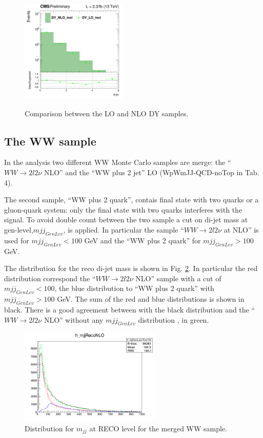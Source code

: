 \begin{figure}[htbp]
{\includegraphics[width=0.45\textwidth]{../AN/Figs/DY/LOvsNLO/log_cratio_dyee_13TeV_njet.png}
}
\caption{
    Comparison between the LO and NLO DY samples.}
    \label{fig:LOvsNLO}
\end{figure}


\subsection{The WW sample}

In the analysis two different WW Monte Carlo samples are merge: the ``$WW \rightarrow 2l 2\nu$ NLO'' and the ``WW plus 2 jet'' LO (WpWmJJ-QCD-noTop in Tab. 4). 

The second sample,  ``WW plus 2 quark'', contais final state with two quarks or a gluon-quark system: only the final state with two quarks interferes with the signal.
To avoid double count between the two sample a cut on di-jet mass at gen-level,$mjj_{GenLev}$, is applied. In particular the sample ``$WW \rightarrow 2l 2\nu$ at NLO'' is used for $mjj_{GenLev} <100$ GeV and the ``WW plus 2 quark'' for $mjj_{GenLev} >100$ GeV.

The  distribution for the reco di-jet mass is shown in Fig. \ref{fig:WW}. In particular the red distribution correspond the ``$WW \rightarrow 2l 2\nu$ NLO'' sample with a cut of  $mjj_{GenLev} <100$, the blue distribution to  ``WW plus 2 quark'' with $mjj_{GenLev} >100$ GeV. The sum of the red and blue distributions is shown in black. There is a good agreement between with the black distribution and the ``$WW \rightarrow 2l 2\nu$ NLO'' without any  $mjj_{GenLev}$ distribution , in green.



\begin{figure}[htbp]
\centering
\includegraphics[width=0.6\textwidth]{../AN/Figs/WW_distribution.png}
\caption{
    Distribution for $m_{jj}$ at RECO level for the merged WW sample.}
    \label{fig:WW}
\end{figure}

